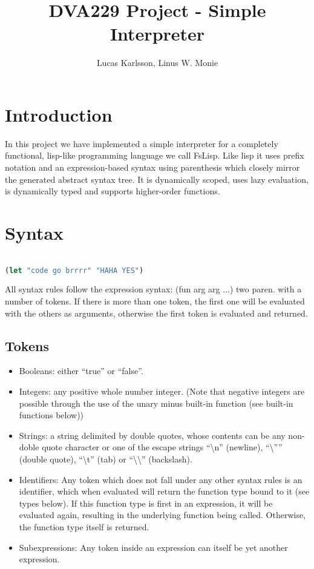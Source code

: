 \documentclass[11pt]{article}
\title{DVA229 Project - Simple Interpreter}
\author{Lucas Karlsson, Linus W. Monie}
\begin{document}
\maketitle

\section*{Introduction}

    In this project we have implemented a simple interpreter for a completely functional, lisp-like programming language we call FsLisp. Like lisp it uses
    prefix notation and an expression-based syntax using parenthesis which closely mirror the generated abstract syntax tree. It is dynamically scoped, 
    uses lazy evaluation, is dynamically typed and supports higher-order functions.

\section{Syntax}

\begin{lstlisting}[language=lisp]

(let "code go brrrr" "HAHA YES")

\end{lstlisting}
    
    All syntax rules follow the expression syntax: (fun arg arg ...)
    two paren. with a number of tokens. If there is more than one token, the first one will be evaluated with the others as arguments, otherwise the first token is evaluated and returned.
    
    \subsection{Tokens}
        \begin{itemize}
            \item Booleans: either “true” or “false”.
            \item Integers: any positive whole number integer. (Note that negative integers are possible through the use of the unary minus built-in function (see built-in functions below))
            \item Strings: a string delimited by double quotes, whose contents can be any non-doble quote character or one of the escape strings
                  “\textbackslash n” (newline), “\textbackslash”” (double quote), “\textbackslash t” (tab) or “\textbackslash \textbackslash” (backslash).
            \item Identifiers: Any token which does not fall under any other syntax rules is an identifier, which when evaluated will return the function type bound to it (see types below). If this function type is first in an expression, it will be evaluated again, resulting in the underlying function being called. Otherwise, the function type itself is returned.
        \item Subexpressions: Any token inside an expression can itself be yet another expression.
        \end{itemize}
\end{document}
